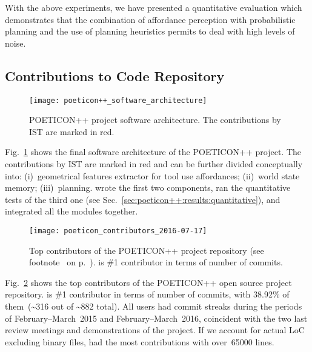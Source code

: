 \bigskip

With the above experiments, we have presented a quantitative evaluation which demonstrates that the combination of affordance perception with probabilistic planning and the use of planning heuristics permits to deal with high levels of noise.

\subsection{Contributions to Code Repository}
\label{sec:poeticon++:results:repo_contributions}

\begin{figure}
\texttt{[image: poeticon++\_software\_architecture]}
\caption[POETICON++ project software architecture.]{POETICON++ project software architecture. The contributions by IST are marked in red.}
\label{fig:poeticon++_sw_arch}
\end{figure}

Fig.~\ref{fig:poeticon++_sw_arch} shows the final software architecture of the POETICON++ project.
The contributions by IST are marked in red and can be further divided conceptually into:
(i)~geometrical features extractor for tool use affordances;
(ii)~world state memory;
(iii)~planning.
\myFullName{} wrote the first two components, ran the quantitative tests of the third one (see Sec.~\ref{sec:poeticon++:results:quantitative}), and integrated all the modules together.

\begin{figure}
\texttt{[image: poeticon\_contributors\_2016-07-17]}
\caption[Top contributors of the POETICON++ project repository.]{Top contributors of the POETICON++ project repository (see footnote~ on p.~\pageref{footnote:poeticon_repo}). \myFullName{} is \#1 contributor in terms of number of commits.}
\label{fig:poeticon_contributors}
\end{figure}

Fig.~\ref{fig:poeticon_contributors} shows the top contributors of the POETICON++ open source project repository.
\myFullName{} is \#1 contributor in terms of number of commits, with 38.92\% of them~(\textasciitilde316 out of \textasciitilde882 total). All users had commit streaks during the periods of February--March~2015 and February--March~2016, coincident with the two last review meetings and demonstrations of the project.
If we account for actual \ac{LoC} excluding binary files, \myFullName{} had the most contributions with over~\num{65000} lines.

